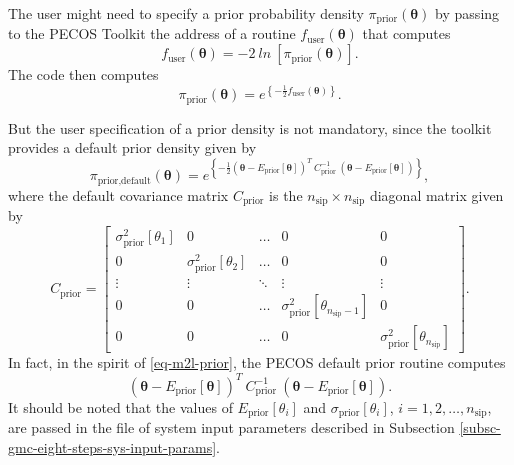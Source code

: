 The user might need to specify a prior probability density $\pi_{\text{prior}}(\boldsymbol{\theta})$
by passing to the PECOS Toolkit the address of a routine $f_{\text{user}}(\boldsymbol{\theta})$ that computes
\begin{equation}\label{eq-m2l-prior}
f_{\text{user}}(\boldsymbol{\theta})=
-2~ln~
\left[
\pi_{\text{prior}}(\boldsymbol{\theta})
\right].
\end{equation}
The code then computes
\begin{equation*}
\pi_{\text{prior}}(\boldsymbol{\theta}) = e^
{
\left\{
-\frac{1}{2}
f_{\text{user}}(\boldsymbol{\theta})
\right\}
}.
\end{equation*}

But the user specification of a prior density is not mandatory, since the toolkit provides a default prior density given by
\begin{equation*}
\pi_{\text{prior,default}}(\boldsymbol{\theta}) =
e^{
\left\{
-\frac{1}{2}
(\boldsymbol{\theta}-E_{\text{prior}}[\boldsymbol{\theta}])^T
~C_{\text{prior}}^{-1}~
(\boldsymbol{\theta}-E_{\text{prior}}[\boldsymbol{\theta}])
\right\}
},
\end{equation*}
where the default covariance matrix $C_{\text{prior}}$ is the $n_{\text{sip}}\times n_{\text{sip}}$ diagonal matrix given by
\begin{equation}\label{eq-default-prior-cov-matrix}
C_{\text{prior}} =
\left[
\begin{array}{cccccc}
\sigma_{\text{prior}}^2[\theta_1] & 0                                 & \ldots & 0                                                  & 0      \\
0                                 & \sigma_{\text{prior}}^2[\theta_2] & \ldots & 0                                                  & 0      \\
\vdots                            & \vdots                            & \ddots & \vdots                                             & \vdots \\
0                                 & 0                                 & \ldots & \sigma_{\text{prior}}^2[\theta_{n_{\text{sip}}-1}] & 0      \\
0                                 & 0                                 & \ldots & 0                                                  & \sigma_{\text{prior}}^2[\theta_{n_{\text{sip}}}]
\end{array}
\right].
\end{equation}
In fact, in the spirit of \eqref{eq-m2l-prior}, the PECOS default prior routine computes
\begin{equation*}
(\boldsymbol{\theta}-E_{\text{prior}}[\boldsymbol{\theta}])^T
~C_{\text{prior}}^{-1}~
(\boldsymbol{\theta}-E_{\text{prior}}[\boldsymbol{\theta}]).
\end{equation*}
It should be noted that the values of $E_{\text{prior}}[\theta_i]$ and $\sigma_{\text{prior}}[\theta_i]$, $i=1,2,\ldots,n_{\text{sip}}$,
are passed in the file of system input parameters described in Subsection \ref{subsc-gmc-eight-steps-sys-input-params}.

